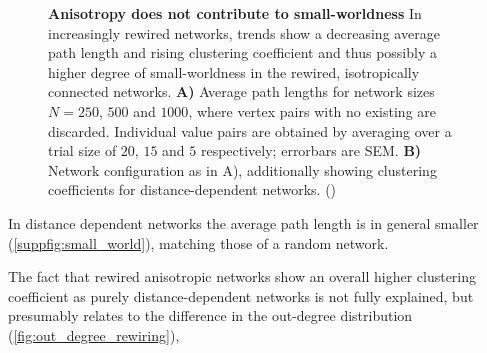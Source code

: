\begin{figure}[htp]
  \centering
  \caption{\textbf{Anisotropy does not contribute to small-worldness}
    In increasingly rewired networks, trends show a decreasing average
    path length and rising clustering coefficient and thus possibly a
    higher degree of small-worldness in the rewired, isotropically
    connected networks.  \textbf{A)} Average path lengths for network
    sizes $N=250$, $500$ and $1000$, where vertex pairs with no
    existing are discarded. Individual value pairs are obtained by
    averaging over a trial size of $20$, $15$ and $5$ respectively;
    errorbars are SEM. \textbf{B)} Network configuration as in A),
    additionally showing clustering coefficients for
    distance-dependent networks.
    ()} %
  \label{fig:small_world_props}
\end{figure}  


In distance dependent networks the average path length is in general
smaller (\autoref{suppfig:small_world}), matching those of a random
network.

The fact that rewired anisotropic networks show an overall higher
clustering coefficient as purely distance-dependent networks is not
fully explained, but presumably relates to the difference in the
out-degree distribution (\autoref{fig:out_degree_rewiring}),





